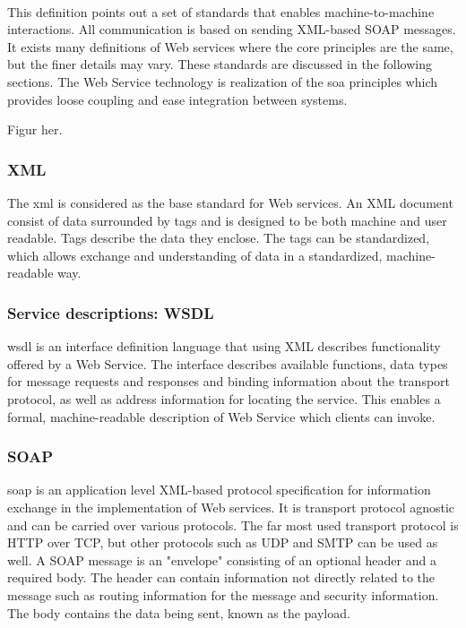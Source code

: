 \paragraph{}

This definition points out a set of standards that enables machine-to-machine
interactions. All communication is based on sending XML-based SOAP messages.
It exists many definitions of Web services where the core principles are the
same, but the finer details may vary.  These standards are discussed in the
following sections. The Web Service technology is realization of the \gls{soa}
principles which provides loose coupling and ease integration between systems.

Figur her.


\subsubsection{XML}

The \gls{xml} is considered as the base standard for Web services. An XML
document consist of data surrounded by tags and is designed to be both machine
and user readable. Tags describe the data they enclose. The tags can be
standardized, which allows exchange and understanding of data in a standardized,
machine-readable way.


\subsubsection{Service descriptions: WSDL}

\gls{wsdl} is an interface definition language that using XML describes
functionality offered by a Web Service. The interface describes available
functions, data types for message requests and responses and binding
information about the transport protocol, as well as address information for
locating the service. This enables a formal, machine-readable description of
Web Service which clients can invoke.


\subsubsection{SOAP}

\gls{soap} is an application level XML-based protocol specification for
information exchange in the implementation of Web services. It is transport
protocol agnostic and can be carried over various protocols. The far most used
transport protocol is HTTP over TCP, but other protocols such as UDP and SMTP
can be used as well. A SOAP message is an "envelope" consisting of an optional
header and a required body. The header can contain information not directly
related to the message such as routing information for the message and
security information. The body contains the data being sent, known as the
payload.

